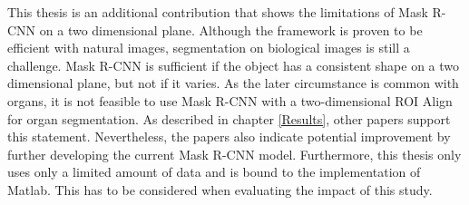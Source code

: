 This thesis is an additional contribution that shows the limitations of Mask R-CNN on a two dimensional plane. Although the framework is proven to be efficient with natural images, segmentation on biological images is still a challenge. Mask R-CNN is sufficient if the object has a consistent shape on a two dimensional plane, but not if it varies.  As the later circumstance is common with organs, it is not feasible to use Mask R-CNN with a two-dimensional ROI Align for organ segmentation. As described in chapter \ref{Results}, other papers support this statement. Nevertheless, the papers also indicate potential improvement by further developing the current Mask R-CNN model. Furthermore, this thesis only uses only a limited amount of data and is bound to the implementation of Matlab. This has to be considered when evaluating the impact of this study. 